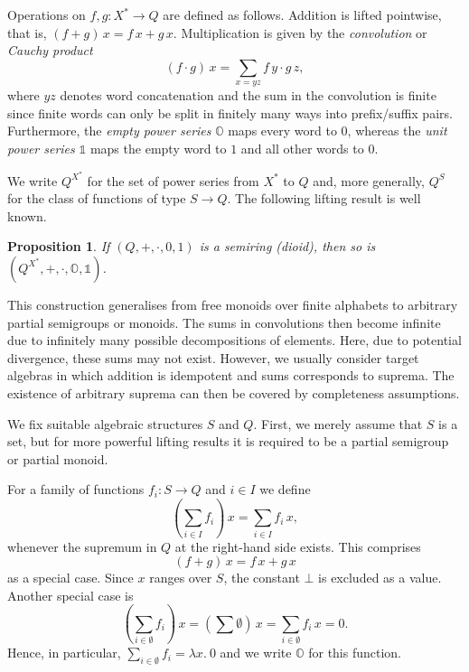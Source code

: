 \documentclass[12pt]{article}
\newcommand{\Al}{X}
\newtheorem{proposition}{Proposition}
\theoremstyle{definition}
\newcommand{\unit}{\mathbb{1}}
\newcommand{\zero}{\mathbb{O}}
\begin{document}
Operations on $f,g:\Al^\ast\to Q$ are defined as follows. Addition is
lifted pointwise, that is, $(f+g)\, x = f\, x + g\, x$. Multiplication is
given by the \emph{convolution} or \emph{Cauchy product}
\begin{equation*}
  (f\cdot g)\, x =\sum_{x=yz} f\, y\cdot g\, z,
\end{equation*}
where $yz$ denotes word concatenation and the sum in the convolution
is finite since finite words can only be split in finitely many ways
into prefix/suffix pairs. Furthermore, the \emph{empty power series}
$\zero$ maps every word to $0$, whereas the \emph{unit power series}
$\unit$ maps the empty word to $1$ and all other words to $0$.

We write $Q^{\Al^\ast}$ for the set of power series from $\Al^\ast$ to
$Q$ and, more generally, $Q^S$ for the class of functions of type
$S\to Q$. The following lifting result is well known.
\begin{proposition}\label{prop:fpslifting}
  If $(Q,+,\cdot,0,1)$ is a semiring (dioid), then so is
  $(Q^{\Al^\ast},+,\cdot,\zero,\unit)$.
\end{proposition}

This construction generalises from free monoids over finite alphabets
to arbitrary partial semigroups or monoids.  The sums in convolutions
then become infinite due to infinitely many possible decompositions of
elements. Here, due to potential divergence, these sums may not
exist. However, we usually consider target algebras in which addition
is idempotent and sums corresponds to suprema. The existence of
arbitrary suprema can then be covered by completeness assumptions.

We fix suitable algebraic structures $S$ and $Q$.  First, we merely
assume that $S$ is a set, but for more powerful lifting results it is
required to be a partial semigroup or partial monoid.

For a family of functions $f_i:S\to Q$
and $i\in I$ we define
\begin{equation*}
  (\sum_{i\in I} f_i)\, x = \sum_{i\in I} f_i\, x,
\end{equation*}
whenever the supremum in $Q$ at the right-hand side exists. This
comprises 
\begin{equation*}
(f+g)\, x = f\, x + g\, x
\end{equation*}
as a special case.  Since $x$ ranges over $S$, the constant $\bot$ is
excluded as a value.  Another special case is
\begin{equation*}
  (\sum_{i\in\emptyset} f_i)\, x = (\sum \emptyset)\, x =
  \sum_{i\in\emptyset} f_i\, x = 0.
\end{equation*}
Hence, in particular, $\sum_{i\in\emptyset} f_i=\lambda x.\ 0$ and we
write $\zero$ for this function.
\end{document}
